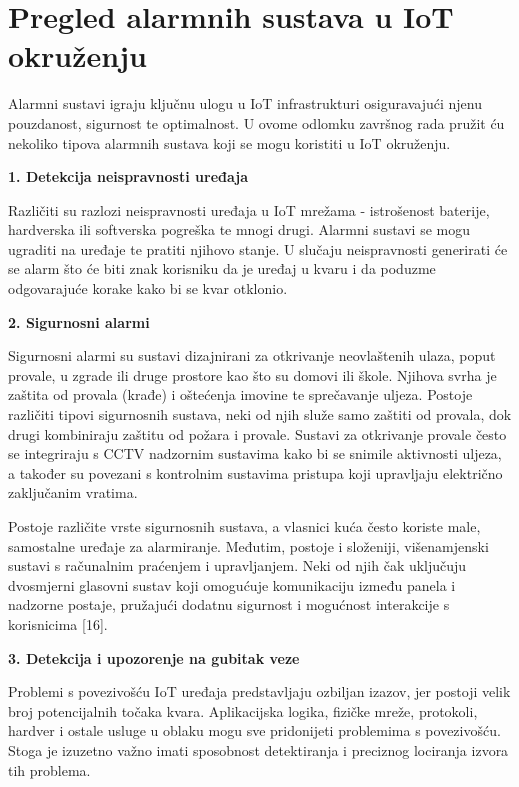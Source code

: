 \documentclass[times, utf8, zavrsni]{fer}
\begin{document}
 \section{Pregled alarmnih sustava u IoT okruženju}

 Alarmni sustavi igraju ključnu ulogu u IoT infrastrukturi osiguravajući njenu pouzdanost, sigurnost te optimalnost. U ovome odlomku završnog rada pružit ću nekoliko tipova alarmnih sustava koji se mogu koristiti u IoT okruženju.

\vspace{\baselineskip}

\textbf{1. Detekcija neispravnosti uređaja}

 Različiti su razlozi neispravnosti uređaja u IoT mrežama - istrošenost baterije, hardverska ili softverska pogreška te mnogi drugi. Alarmni sustavi se mogu ugraditi na uređaje te pratiti njihovo stanje. U slučaju neispravnosti generirati će se alarm što će biti znak korisniku da je uređaj u kvaru i da poduzme odgovarajuće korake kako bi se kvar otklonio.

\vspace{\baselineskip}

\textbf{ 2. Sigurnosni alarmi}
 
Sigurnosni alarmi su sustavi dizajnirani za otkrivanje neovlaštenih ulaza, poput provale, u zgrade ili druge prostore kao što su domovi ili škole. Njihova svrha je zaštita od provala (krađe) i oštećenja imovine te sprečavanje uljeza. Postoje različiti tipovi sigurnosnih sustava, neki od njih služe samo zaštiti od provala, dok drugi kombiniraju zaštitu od požara i provale. Sustavi za otkrivanje provale često se integriraju s CCTV nadzornim sustavima kako bi se snimile aktivnosti uljeza, a također su povezani s kontrolnim sustavima pristupa koji upravljaju električno zaključanim vratima.

Postoje različite vrste sigurnosnih sustava, a vlasnici kuća često koriste male, samostalne uređaje za alarmiranje. Međutim, postoje i složeniji, višenamjenski sustavi s računalnim praćenjem i upravljanjem. Neki od njih čak uključuju dvosmjerni glasovni sustav koji omogućuje komunikaciju između panela i nadzorne postaje, pružajući dodatnu sigurnost i mogućnost interakcije s korisnicima [16].

\vspace{\baselineskip}
\newpage
 \textbf{3. Detekcija i upozorenje na gubitak veze}

Problemi s povezivošću IoT uređaja predstavljaju ozbiljan izazov, jer postoji velik broj potencijalnih točaka kvara. Aplikacijska logika, fizičke mreže, protokoli, hardver i ostale usluge u oblaku mogu sve pridonijeti problemima s povezivošću. Stoga je izuzetno važno imati sposobnost detektiranja i preciznog lociranja izvora tih problema.
\end{document}

